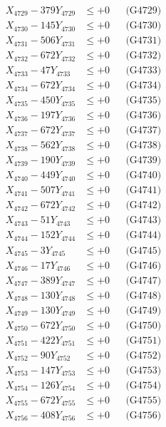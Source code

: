 \documentclass[a4paper,10pt]{article}
\begin{document}
{\begin{align}
X_{4729} - 379Y_{4729} &\leq +0 && \text{(G4729)} \\
X_{4730} - 145Y_{4730} &\leq +0 && \text{(G4730)} \\
\allowbreak
X_{4731} - 506Y_{4731} &\leq +0 && \text{(G4731)} \\
X_{4732} - 672Y_{4732} &\leq +0 && \text{(G4732)} \\
X_{4733} - 47Y_{4733} &\leq +0 && \text{(G4733)} \\
X_{4734} - 672Y_{4734} &\leq +0 && \text{(G4734)} \\
X_{4735} - 450Y_{4735} &\leq +0 && \text{(G4735)} \\
X_{4736} - 197Y_{4736} &\leq +0 && \text{(G4736)} \\
X_{4737} - 672Y_{4737} &\leq +0 && \text{(G4737)} \\
X_{4738} - 562Y_{4738} &\leq +0 && \text{(G4738)} \\
X_{4739} - 190Y_{4739} &\leq +0 && \text{(G4739)} \\
X_{4740} - 449Y_{4740} &\leq +0 && \text{(G4740)} \\
\allowbreak
X_{4741} - 507Y_{4741} &\leq +0 && \text{(G4741)} \\
X_{4742} - 672Y_{4742} &\leq +0 && \text{(G4742)} \\
X_{4743} - 51Y_{4743} &\leq +0 && \text{(G4743)} \\
X_{4744} - 152Y_{4744} &\leq +0 && \text{(G4744)} \\
X_{4745} - 3Y_{4745} &\leq +0 && \text{(G4745)} \\
X_{4746} - 17Y_{4746} &\leq +0 && \text{(G4746)} \\
X_{4747} - 389Y_{4747} &\leq +0 && \text{(G4747)} \\
X_{4748} - 130Y_{4748} &\leq +0 && \text{(G4748)} \\
X_{4749} - 130Y_{4749} &\leq +0 && \text{(G4749)} \\
X_{4750} - 672Y_{4750} &\leq +0 && \text{(G4750)} \\
\allowbreak
X_{4751} - 422Y_{4751} &\leq +0 && \text{(G4751)} \\
X_{4752} - 90Y_{4752} &\leq +0 && \text{(G4752)} \\
X_{4753} - 147Y_{4753} &\leq +0 && \text{(G4753)} \\
X_{4754} - 126Y_{4754} &\leq +0 && \text{(G4754)} \\
X_{4755} - 672Y_{4755} &\leq +0 && \text{(G4755)} \\
X_{4756} - 408Y_{4756} &\leq +0 && \text{(G4756)} \\

\end{align}}
\end{document}
